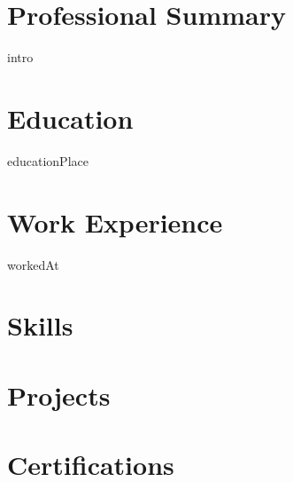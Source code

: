 \documentclass[11pt,a4paper,sans]{moderncv}
\begin{document}
\makecvtitle

\section{Professional Summary}
{intro}

\section{Education}
{\fontsize{11}{12}\selectfont educationPlace}

\section{Work Experience}
{\fontsize{11}{13}\selectfont workedAt}

\section{Skills}

\section{Projects}

\section{Certifications}
\end{document}
